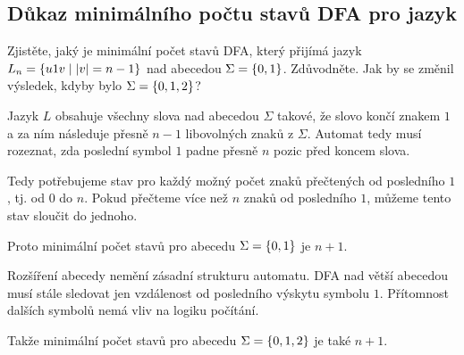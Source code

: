 
\subsection{Důkaz minimálního počtu stavů DFA pro jazyk}
Zjistěte, jaký je minimální počet stavů DFA, který přijímá jazyk $L_n = \left\lbrace u1v \mid |v|=n-1 \right\rbrace$ nad abecedou
$\Sigma = \left\lbrace 0,1 \right\rbrace$. Zdůvodněte. Jak by se změnil výsledek, kdyby bylo $\Sigma = \left\lbrace 0,1,2 \right\rbrace$?
\newline

Jazyk $L$ obsahuje všechny slova nad abecedou $\Sigma$ takové, že slovo končí znakem $1$ a za ním následuje přesně $n-1$
libovolných znaků z $\Sigma$. Automat tedy musí rozeznat, zda poslední symbol $1$ padne přesně $n$ pozic před koncem
slova.

Tedy potřebujeme stav pro každý možný počet znaků přečtených od posledního $1$, tj. od 0 do $n$. Pokud přečteme více než
$n$ znaků od posledního $1$, můžeme tento stav sloučit do jednoho.

Proto minimální počet stavů pro abecedu $\Sigma = \left\lbrace 0,1 \right\rbrace$ je $n+1$.

Rozšíření abecedy nemění zásadní strukturu automatu. DFA nad větší abecedou musí stále sledovat jen vzdálenost od
posledního výskytu symbolu $1$. Přítomnost dalších symbolů nemá vliv na logiku počítání.

Takže minimální počet stavů pro abecedu $\Sigma = \left\lbrace 0,1,2 \right\rbrace$ je také $n+1$.



